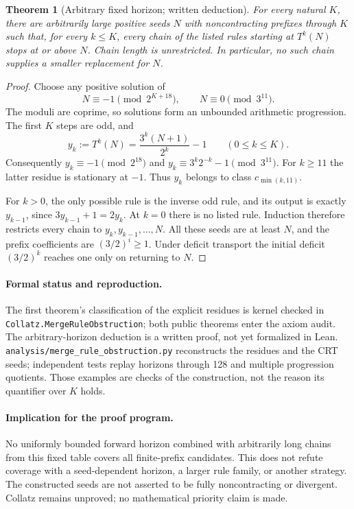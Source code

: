 \documentclass[10pt]{article}
\newtheorem{theorem}{Theorem}
\begin{document}
\begin{theorem}[Arbitrary fixed horizon; written deduction]
For every natural $K$, there are arbitrarily large positive seeds $N$
with noncontracting prefixes through $K$ such that, for every $k\leq K$,
every chain of the listed rules starting at $T^k(N)$ stops at or above
$N$. Chain length is unrestricted. In particular, no such chain supplies
a smaller replacement for $N$.
\end{theorem}
\begin{proof}
Choose any positive solution of
\[
N\equiv-1\pmod{2^{K+18}},\qquad N\equiv0\pmod{3^{11}}.
\]
The moduli are coprime, so solutions form an unbounded arithmetic
progression. The first $K$ steps are odd, and
\[
y_k:=T^k(N)=\frac{3^k(N+1)}{2^k}-1\qquad(0\leq k\leq K).
\]
Consequently $y_k\equiv-1\pmod{2^{18}}$ and
$y_k\equiv3^k2^{-k}-1\pmod{3^{11}}$. For $k\geq11$ the latter
residue is stationary at $-1$. Thus $y_k$ belongs to class
$c_{\min(k,11)}$.

For $k>0$, the only possible rule is the inverse odd rule, and its output
is exactly $y_{k-1}$, since $3y_{k-1}+1=2y_k$. At $k=0$ there is no
listed rule. Induction therefore restricts every chain to
$y_k,y_{k-1},\ldots,N$. All these seeds are at least $N$, and the
prefix coefficients are $(3/2)^i\geq1$. Under deficit transport the
initial deficit $(3/2)^k$ reaches one only on returning to $N$.
\end{proof}

\paragraph{Formal status and reproduction.}
The first theorem's classification of the explicit residues is kernel
checked in \texttt{Collatz.MergeRuleObstruction}; both public theorems
enter the axiom audit. The arbitrary-horizon deduction is a written proof,
not yet formalized in Lean. \texttt{analysis/merge\_rule\_obstruction.py}
reconstructs the residues and the CRT seeds; independent tests replay
horizons through 128 and multiple progression quotients. Those examples
are checks of the construction, not the reason its quantifier over $K$
holds.

\paragraph{Implication for the proof program.}
No uniformly bounded forward horizon combined with arbitrarily long
chains from this fixed table covers all finite-prefix candidates.
This does not refute coverage with a seed-dependent horizon, a larger
rule family, or another strategy. The constructed seeds are not asserted
to be fully noncontracting or divergent. Collatz remains unproved;
no mathematical priority claim is made.
\end{document}
